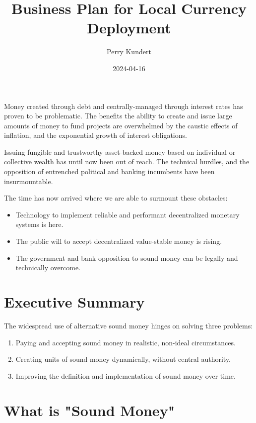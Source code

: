 \documentclass[11pt]{article}
\author{Perry Kundert}
\date{2024-04-16}
\title{Business Plan for Local Currency Deployment}
\begin{document}
\maketitle
\begin{ABSTRACT}
Money created through debt and centrally-managed through interest rates has proven to be
problematic.  The benefits the ability to create and issue large amounts of money to fund projects
are overwhelmed by the caustic effects of inflation, and the exponential growth of interest
obligations.

Issuing fungible and trustworthy asset-backed money based on individual or collective wealth has
until now been out of reach.  The technical hurdles, and the opposition of entrenched political and
banking incumbents have been insurmountable.

The time has now arrived where we are able to surmount these obstacles:
\begin{itemize}
\item Technology to implement reliable and performant decentralized monetary systems is here.
\item The public will to accept decentralized value-stable money is rising.
\item The government and bank opposition to sound money can be legally and technically overcome.
\end{itemize}
\end{ABSTRACT}

\setcounter{tocdepth}{3}
\tableofcontents

\section{Executive Summary}
\label{sec:org141ae1a}

The widespread use of alternative sound money hinges on solving three problems:

\begin{enumerate}
\item Paying and accepting sound money in realistic, non-ideal circumstances.
\item Creating units of sound money dynamically, without central authority.
\item Improving the definition and implementation of sound money over time.
\end{enumerate}

\section{What is "Sound Money"}
\label{sec:orgcdd9990}
\end{document}
